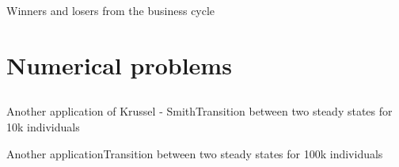 \documentclass{beamer}
\begin{document}
\begin{frame}{Winners and losers from the business cycle}
\end{frame}

\section{Numerical problems}
\subsection{}
\begin{frame}{Another application of Krussel - Smith}{Transition between two steady states for 10k individuals}
\end{frame}

\begin{frame}{Another application}{Transition between two steady states for 100k individuals}
\end{frame}
\end{document}
